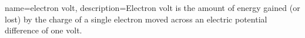 {
    name=electron volt,
    description={Electron volt is the amount of energy gained (or lost) by the charge of a single electron moved across an electric potential difference of one volt.}
}
 
